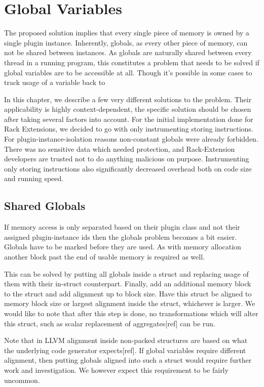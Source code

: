 \chapter {Global Variables}

The proposed solution implies that every single piece of memory is owned by a
single plugin instance. Inherently, globals, as every other piece of memory, can
not be shared between instances. As globals are naturally shared between every
thread in a running program, this constitutes a problem that needs to be solved
if global variables are to be accessible at all. Though it's possible in some
cases to track usage of a variable back to 

In this chapter, we describe a few very different solutions to the problem.
Their applicability is highly context-dependent, the specific solution should be
chosen after taking several factors into account. For the initial implementation
done for Rack Extensions, we decided to go with only instrumenting storing
instructions. For plugin-instance-isolation reasons non-constant globals were
already forbidden. There was no sensitive data which needed protection, and
Rack-Extension developers are trusted not to do anything malicious on purpose.
Instrumenting only storing instructions also significantly decreased overhead
both on code size and running speed.


\section {Shared Globals}

If memory access is only separated based on their plugin class and not their
assigned plugin-instance ids then the globals problem becomes a bit easier.
Globals have to be marked before they are used. As with memory allocation
another block past the end of usable memory is required as well.

This can be solved by putting all globals inside a struct and replacing usage of
them with their in-struct counterpart. Finally, add an additional memory block
to the struct and add alignment up to block size. Have this struct be aligned to
memory block size or largest alignment inside the struct, whichever is larger.
We would like to note that after this step is done, no transformations which
will alter this struct, such as scalar replacement of aggregates[ref] can be
run.

Note that in LLVM alignment inside non-packed structures are based on what the
underlying code generator expects[ref]. If global variables require different
alignment, then putting globals aligned into such a struct would require further
work and investigation. We however expect this requirement to be fairly
uncommon.

